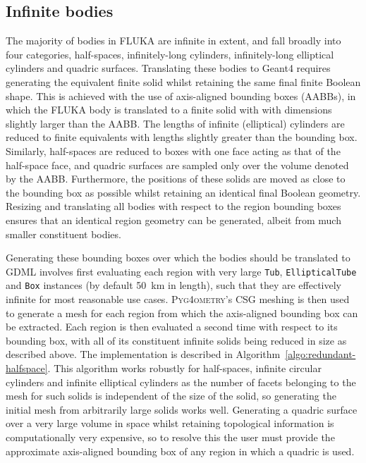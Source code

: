\documentclass[final,5p,times,twocolumn]{elsarticle}
\newcommand{\pyinline}[1]{\lstinline[postbreak={}]{#1}}
\newcommand{\PYGEOMETRY}{\textsc{Pyg4ometry}}
\begin{document}
\subsection{Infinite bodies}
The majority of bodies in FLUKA are infinite in extent, and fall
broadly into four categories, half-spaces, infinitely-long cylinders,
infinitely-long elliptical cylinders and quadric surfaces.
Translating these bodies to Geant4 requires generating the equivalent
finite solid whilst retaining the same final finite Boolean shape.
This is achieved with the use of axis-aligned bounding boxes (AABBs),
in which the FLUKA body is translated to a finite solid with with
dimensions slightly larger than the AABB.  The lengths of infinite
(elliptical) cylinders are reduced to finite equivalents with lengths
slightly greater than the bounding box.  Similarly, half-spaces are
reduced to boxes with one face acting as that of the half-space face,
and quadric surfaces are sampled only over the volume denoted by the
AABB.  Furthermore, the positions of these solids are moved as close
to the bounding box as possible whilst retaining an identical final
Boolean geometry.   Resizing and translating all bodies with respect
to the region bounding boxes ensures that an identical region geometry can
be generated, albeit from much smaller constituent bodies.

Generating these bounding boxes over which the bodies should be translated
to GDML involves first evaluating each region with very large \pyinline{Tub},
\pyinline{EllipticalTube} and \pyinline{Box} instances (by default
\SI{50}{\km} in length), such that they are effectively infinite for most
reasonable use cases.  \PYGEOMETRY{}'s CSG meshing is then used to generate
a mesh for each region from which the axis-aligned bounding box can be
extracted.  Each region is then evaluated a second time with respect to its
 bounding box, with all of its constituent infinite solids being
reduced in size as described above.  The implementation is described in
Algorithm~\ref{algo:redundant-halfspace}. This algorithm works robustly for
half-spaces, infinite circular cylinders and infinite elliptical cylinders
as the number of facets belonging to the mesh for such solids is
independent of the size of the solid, so generating the initial mesh from
arbitrarily large solids works well.  Generating a quadric surface over a very large
volume in space whilst retaining topological information is computationally
very expensive, so to resolve this the user must provide the approximate
axis-aligned bounding box of any region in which a quadric is used.
\end{document}

